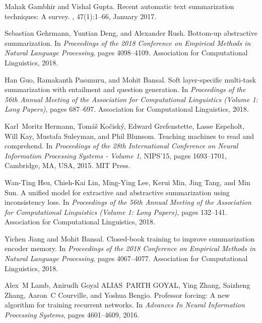 \documentclass{article}
\begin{document}
\begin{thebibliography}{10}
Mahak Gambhir and Vishal Gupta.
\newblock Recent automatic text summarization techniques: A survey.
, 47(1):1--66, January 2017.

Sebastian Gehrmann, Yuntian Deng, and Alexander Rush.
\newblock Bottom-up abstractive summarization.
\newblock In {\em Proceedings of the 2018 Conference on Empirical Methods in
  Natural Language Processing}, pages 4098--4109. Association for Computational
  Linguistics, 2018.

Han Guo, Ramakanth Pasunuru, and Mohit Bansal.
\newblock Soft layer-specific multi-task summarization with entailment and
  question generation.
\newblock In {\em Proceedings of the 56th Annual Meeting of the Association for
  Computational Linguistics (Volume 1: Long Papers)}, pages 687--697.
  Association for Computational Linguistics, 2018.

Karl~Moritz Hermann, Tom\'{a}\v{s} Ko\v{c}isk\'{y}, Edward Grefenstette, Lasse
  Espeholt, Will Kay, Mustafa Suleyman, and Phil Blunsom.
\newblock Teaching machines to read and comprehend.
\newblock In {\em Proceedings of the 28th International Conference on Neural
  Information Processing Systems - Volume 1}, NIPS'15, pages 1693--1701,
  Cambridge, MA, USA, 2015. MIT Press.

Wan-Ting Hsu, Chieh-Kai Lin, Ming-Ying Lee, Kerui Min, Jing Tang, and Min Sun.
\newblock A unified model for extractive and abstractive summarization using
  inconsistency loss.
\newblock In {\em Proceedings of the 56th Annual Meeting of the Association for
  Computational Linguistics (Volume 1: Long Papers)}, pages 132--141.
  Association for Computational Linguistics, 2018.

Yichen Jiang and Mohit Bansal.
\newblock Closed-book training to improve summarization encoder memory.
\newblock In {\em Proceedings of the 2018 Conference on Empirical Methods in
  Natural Language Processing}, pages 4067--4077. Association for Computational
  Linguistics, 2018.

Alex~M Lamb, Anirudh Goyal ALIAS~PARTH GOYAL, Ying Zhang, Saizheng Zhang,
  Aaron~C Courville, and Yoshua Bengio.
\newblock Professor forcing: A new algorithm for training recurrent networks.
\newblock In {\em Advances In Neural Information Processing Systems}, pages
  4601--4609, 2016.


\end{thebibliography}
\end{document}

